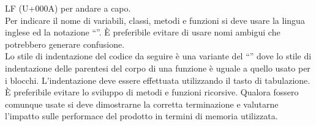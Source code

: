 \documentclass[../NormeDiProgetto.tex]{subfiles}
\begin{document}
					LF (U+000A) per andare a capo.\\
					Per indicare il nome di variabili, classi, metodi e funzioni si deve usare la lingua
					inglese ed la notazione ``''. È preferibile evitare di usare nomi ambigui che
					potrebbero generare confusione.\\
					Lo stile di indentazione del codice da seguire è una variante del ``'' dove lo stile
					di indentazione delle parentesi del corpo di una funzione è uguale a quello usato per
					i blocchi. L'indentazione deve essere effettuata utilizzando il tasto di tabulazione.\\
					È preferibile evitare lo sviluppo di metodi e funzioni ricorsive. Qualora fossero
					comunque usate si deve dimostrarne la corretta terminazione e valutarne l'impatto sulle
					performace del prodotto in termini di memoria utilizzata.\\
\end{document}
